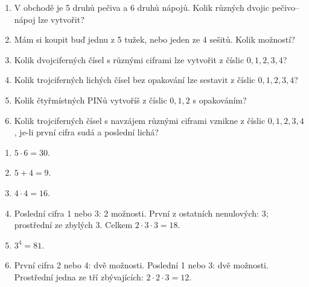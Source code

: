 \documentclass[11pt,a4paper]{article}
\begin{document}
\begin{zadaniReseniBox}[title={Domácí úkol}]

\begin{enumerate}[label=\alph*),leftmargin=*,itemsep=2pt]

\item V obchodě je 5 druhů pečiva a 6 druhů nápojů. Kolik různých dvojic pečivo--nápoj lze vytvořit?
\item Mám si koupit buď jednu z 5 tužek, nebo jeden ze 4 sešitů. Kolik možností?
\item Kolik dvojciferných čísel s různými ciframi lze vytvořit z číslic $0,1,2,3,4$?
\item Kolik trojciferných lichých čísel bez opakování lze sestavit z číslic $0,1,2,3,4$?
\item Kolik čtyřmístných PINů vytvoříš z číslic $0,1,2$ s opakováním?
\item Kolik trojciferných čísel s navzájem různými ciframi vznikne z číslic $0,1,2,3,4$, je-li první cifra sudá a poslední lichá?

\end{enumerate}

\tcblower

\begin{enumerate}[label=\alph*),leftmargin=*,itemsep=2pt]

\item $5\cdot6=30$.
\item $5+4=9$.
\item $4\cdot4=16$.
\item Poslední cifra 1 nebo 3: $2$ možnosti. První z ostatních nenulových: $3$; prostřední ze zbylých $3$. Celkem $2\cdot3\cdot3=18$.
\item $3^4=81$.
\item První cifra 2 nebo 4: dvě možnosti. Poslední 1 nebo 3: dvě možnosti. Prostřední jedna ze tří zbývajících: $2\cdot2\cdot3=12$.

\end{enumerate}

\end{zadaniReseniBox}


\end{document}

